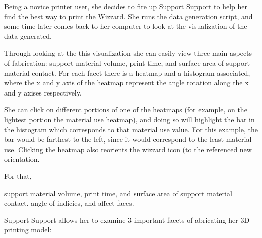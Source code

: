 \documentclass{sigchi}
\begin{document}
Being a novice printer user, she decides to fire up Support Support to help her find the best way to print the Wizzard.  She runs the data generation script, and some time later comes back to her computer to look at the visualization of the data generated.

Through looking at the this visualization she can easily view three main aspects of fabrication: support material volume, print time, and surface area of support material contact. For each facet there is a heatmap and a histogram associated, where the x and y axis of the heatmap represent the angle rotation along the x and y axises respectively.

She can click on different portions of one of the heatmaps (for example, on the lightest portion the material use heatmap), and doing so will highlight the bar in the histogram which corresponds to that material use value. For this example, the bar would be farthest to the left, since it would correspond to the least material use. Clicking the heatmap also reorients the wizzard icon (to the referenced new orientation. 

For that,  

support material volume, print time, and surface area of support material contact. angle of indicies, and affect faces.

Support Support allows her to examine 3 important facets of abricating her 3D printing model: 
\end{document}
